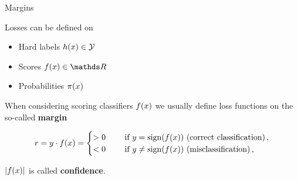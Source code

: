 \begin{vbframe}{Margins} 

Losses can be defined on 

\begin{itemize}
  \item Hard labels $h(x) \in \mathcal{Y}$
  \item Scores $\fx \in \R$
  \item Probabilities $\pi(x)$
\end{itemize}

\lz 

When considering scoring classifiers $f(x)$ we usually define loss functions on the so-called \textbf{margin}

$$
r = y\cdot f(x) =  \begin{cases} > 0  \quad &\text{ if } y = \operatorname{sign}(f(x)) \text{ (correct classification)}\,, \\
                      < 0 \quad &\text{ if } y \ne \operatorname{sign}(f(x)) \text{ (misclassification)}\,, \end{cases}
$$

$|f(x)|$ is called \textbf{confidence}.








\end{vbframe}








